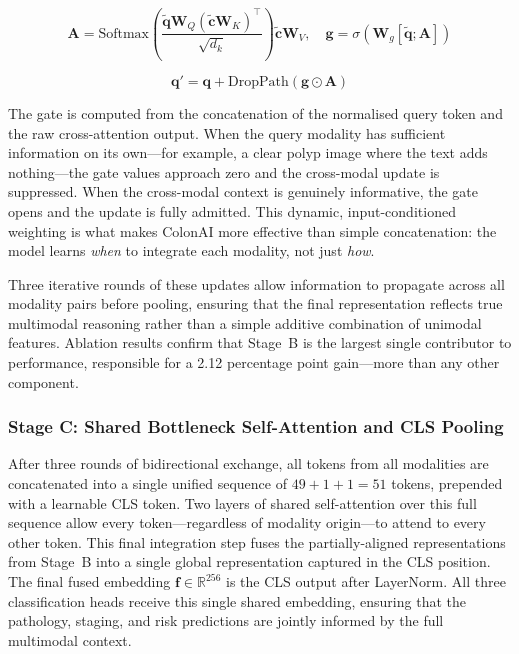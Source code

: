 \documentclass[conference]{IEEEtran}
\begin{document}
\begin{equation}
  \mathbf{A} = \text{Softmax}\!\!\left(
    \frac{\tilde{\mathbf{q}}\mathbf{W}_Q(\tilde{\mathbf{c}}\mathbf{W}_K)^\top}
    {\sqrt{d_k}}\right)\tilde{\mathbf{c}}\mathbf{W}_V, \quad
  \mathbf{g} = \sigma(\mathbf{W}_g[\tilde{\mathbf{q}};\mathbf{A}])
  \label{eq:gca}
\end{equation}

\begin{equation}
  \mathbf{q}' = \mathbf{q} + \text{DropPath}(\mathbf{g}\odot\mathbf{A})
  \label{eq:gate_res}
\end{equation}

The gate is computed from the concatenation of the normalised query token and
the raw cross-attention output. When the query modality has sufficient
information on its own---for example, a clear polyp image where the text
adds nothing---the gate values approach zero and the cross-modal update is
suppressed. When the cross-modal context is genuinely informative, the gate
opens and the update is fully admitted. This dynamic, input-conditioned
weighting is what makes ColonAI more effective than simple concatenation:
the model learns \emph{when} to integrate each modality, not just \emph{how}.

Three iterative rounds of these updates allow information to propagate
across all modality pairs before pooling, ensuring that the final
representation reflects true multimodal reasoning rather than a simple
additive combination of unimodal features. Ablation results confirm that
Stage~B is the largest single contributor to performance, responsible for
a 2.12 percentage point gain---more than any other component.

\subsubsection{Stage C: Shared Bottleneck Self-Attention and CLS Pooling}

After three rounds of bidirectional exchange, all tokens from all modalities
are concatenated into a single unified sequence of $49\!+\!1\!+\!1\!=\!51$
tokens, prepended with a learnable CLS token. Two layers of shared
self-attention over this full sequence allow every token---regardless of
modality origin---to attend to every other token. This final integration step
fuses the partially-aligned representations from Stage~B into a single global
representation captured in the CLS position. The final fused embedding
$\mathbf{f}\in\mathbb{R}^{256}$ is the CLS output after LayerNorm. All three
classification heads receive this single shared embedding, ensuring that the
pathology, staging, and risk predictions are jointly informed by the full
multimodal context.
\end{document}

